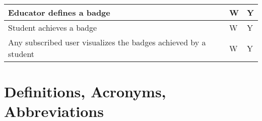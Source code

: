 \begin{center}
\begin{longtable}{|p{8.7cm}|p{3cm}|p{3cm}|}
        Educator defines a badge                                                                                                              & W                      & Y               \\ \hline
        Student achieves a badge                                                                                                              & W                      & Y               \\ \hline
        Any subscribed user visualizes the badges achieved by a student                                                                       & W                      & Y               \\ \hline
    \end{longtable}
\end{center}


\section{Definitions, Acronyms, Abbreviations}

